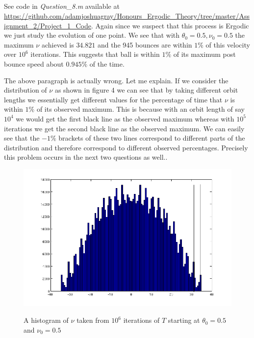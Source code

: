 \documentclass{unswmaths}
\begin{document}
\subsection{}

See code in \emph{Question\_8.m} available at \url{https://github.com/adamjoshuagray/Honours_Ergodic_Theory/tree/master/Assignment_2/Project_1_Code}.
Again since we suspect that this process is Ergodic we just study the evolution of one point.
We see that with $ \theta_0 = 0.5, \nu_0 = 0.5 $ the maximum $ \nu $ achieved is $ 34.821 $ and the 945 bounces are within $ 1\%$ of this velocity over $ 10^6 $ iterations. This suggests that ball is within $ 1\%$ of its maximum post bounce speed about $ 0.945\% $ of the time. 

The above paragraph is actually wrong. Let me explain. If we consider the distribution of $ \nu $ as shown in figure 4 we can see that by taking different orbit lengths we essentially get different values for the percentage of time that $ \nu $ is within $ 1\% $ of its observed maximum. This is because with an orbit length of say $ 10^4 $ we would get the first black line as the observed maximum whereas with $ 10^5 $ iterations we get the second black line as the observed maximum. We can easily see that the $ -1\% $ brackets of these two lines correspond to different parts of the distribution and therefore correspond to different observed percentages.
Precisely this problem occurs in the next two questions as well..


\begin{figure}[h]
    \includegraphics[scale=0.5]{nu_Histogram}
    \label{nu_Histogram}
    \caption{A histogram of $ \nu $ taken from $ 10^6 $ iterations of $ T $ starting at $ \theta_0 = 0.5 $ and $ \nu_0 = 0.5 $ }
\end{figure}
\end{document}
